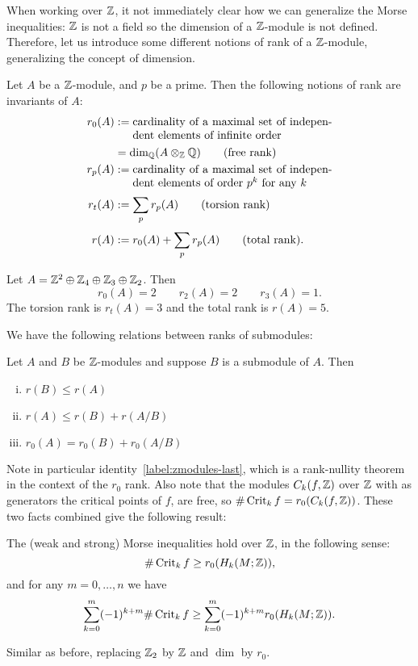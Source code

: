 When working over $\mathbb{Z}$, it not immediately clear how we can generalize the Morse inequalities: $ \mathbb{Z}$ is not a field so the dimension of a $\mathbb{Z}$-module is not defined.
Therefore, let us introduce some different notions of rank of a $\mathbb{Z}$-module, generalizing the concept of dimension.
\begin{definition}
    Let $A$ be a  $\mathbb{Z}$-module, and $p$ be a prime.
    Then the following notions of rank are invariants of $A$:
    \begin{align*}
        r_0(A) &:= \parbox[t]{6.2cm}{cardinality of a maximal set of independent elements of infinite order}\\[0.3em]
            &= \dim_{\Q}(A \otimes_{\Z} \Q) \tag{free rank}
            \\
        r_p(A) &:= \parbox[t]{6.2cm}{cardinality of a maximal set of independent elements of order $p^{k}$ for any $k$}\\[0.3em]
        r_t(A) &:= \sum_{p} r_p(A) \tag{torsion rank}
        \\[0.3em]
        r(A) &:= r_0(A) + \sum_{p}r_p(A) \tag{total rank}
    .\end{align*}
\end{definition}
\begin{eg}
    Let $A = \mathbb{Z}^2 \oplus \mathbb{Z}_4 \oplus \mathbb{Z}_3 \oplus \mathbb{Z}_2$.
    Then
    \[
        r_0(A) = 2 \qquad
        r_2(A) = 2 \qquad
        r_3(A) = 1
    .\]
    The torsion rank is $r_t(A) = 3$ and the total rank is $r(A) = 5$.
\end{eg}
We have the following relations between ranks of submodules:
\begin{lemma}
    Let $A$ and $B$ be $\mathbb{Z}$-modules and suppose $B$ is a submodule of $A$.
    Then
    \begin{enumerate}[(i)]
        \item $r(B) \le  r(A)$
        \item $r(A) \le  r(B) + r(A / B)$
        \item  $ r_0(A) = r_0(B) + r_0(A/B)$ \label{label:zmodules-last}
    \end{enumerate}
\end{lemma}

Note in particular identity~\ref{label:zmodules-last}, which is a rank-nullity theorem in the context of the $r_0$ rank.
Also note that the modules $C_k(f, \mathbb{Z})$ over $\mathbb{Z}$ with as generators the critical points of $f$, are free, so $\# \operatorname{Crit}_k f =r_0(C_k(f, \mathbb{Z}))$.
These two facts combined give the following result:
\begin{theorem}
    The (weak and strong) Morse inequalities hold over $\mathbb{Z}$, in the following sense:
    \[
        \# \operatorname{Crit}_k f \ge  r_0(H_k(M; \mathbb{Z}))
    ,\]
    and for any $m = 0, \ldots, n$ we have
        \[
            \sum_{k=0}^{m} (-1)^{k+m} \# \operatorname{Crit}_k f \ge  \sum_{k=0}^{m} (-1)^{k+m} r_0(H_k(M; \mathbb{Z}))
        .\]
\end{theorem}
\begin{myproof}
    Similar as before, replacing $\mathbb{Z}_2$ by $\mathbb{Z}$ and $\dim$ by $r_0$.
\end{myproof}





